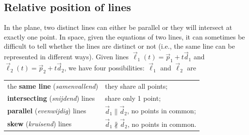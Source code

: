 \subsection{Relative position of lines}

In the plane, two distinct lines can either be parallel or they will intersect at exactly one point. In space, given the equations of two lines, it can sometimes be difficult to tell whether the lines are distinct or not (i.e., the same line can be represented in different ways). Given lines $\vec\ell_1(t) = \vec p_1 + t\vec d_1$ and $\vec \ell_2(t) = \vec p_2+t\vec d_2$, we have four possibilities: $\vec \ell_1$ and $\vec \ell_2$ are

\renewcommand{\arraystretch}{1.5}
\begin{center}
\begin{tabular}{p{200pt}p{150pt}}
the \textbf{same line} (\textit{samenvallend}) & they share all points; \\
\textbf{intersecting} (\textit{snijdend}) lines & share only 1 point;\\
\textbf{parallel} (\textit{evenwijdig}) lines & $\vec d_1\parallel \vec d_2$, no points in common; \\
\textbf{skew} (\textit{kruisend}) lines & $\vec d_1 \not\parallel \vec d_2$, no points in common. 
\index[aut]{samenvallend} \index[aut]{snijdend} \index[aut]{evenwijdig} \index{same line} \index{intersecting} \index {parallel}
\end{tabular}
\end{center}
\renewcommand{\arraystretch}{1}



